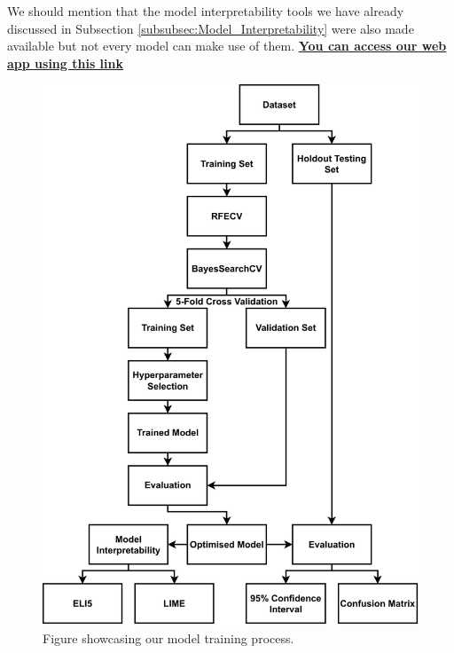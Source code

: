 We should mention that the model interpretability tools we have already discussed in Subsection \ref{subsubsec:Model_Interpretability} were also made available but not every model can make use of them. \href{https://alphafold-dataset-drug-binding-prediction.streamlit.app/}{\textbf{You can access our web app using this link}}

\begin{figure}[!hb]
    \centering
    \includegraphics[width=0.83\linewidth]{images/Model_Training.pdf}    
    \caption{Figure showcasing our model training process.}
    \label{fig:Model_Training} 
\end{figure}

